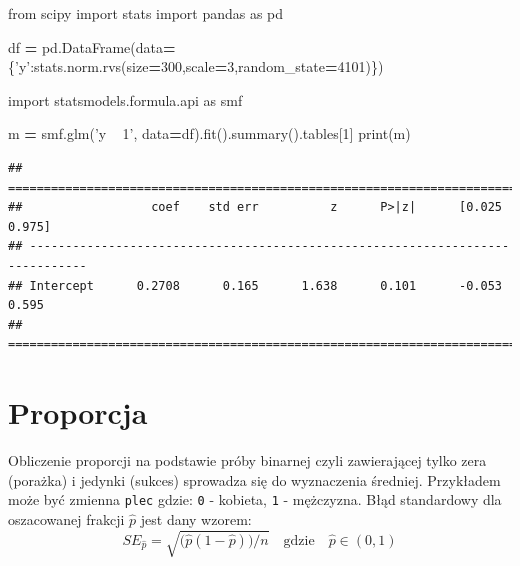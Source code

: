 \documentclass[polish,]{book}
\newenvironment{Shaded}{\begin{snugshade}}{\end{snugshade}}
\newcommand{\BuiltInTok}[1]{#1}
\newcommand{\DecValTok}[1]{\textcolor[rgb]{0.00,0.00,0.81}{#1}}
\newcommand{\ImportTok}[1]{#1}
\newcommand{\NormalTok}[1]{#1}
\newcommand{\OperatorTok}[1]{\textcolor[rgb]{0.81,0.36,0.00}{\textbf{#1}}}
\newcommand{\StringTok}[1]{\textcolor[rgb]{0.31,0.60,0.02}{#1}}
\begin{document}
\begin{Shaded}
\begin{Highlighting}[]
\ImportTok{from}\NormalTok{ scipy }\ImportTok{import}\NormalTok{ stats}
\ImportTok{import}\NormalTok{ pandas }\ImportTok{as}\NormalTok{ pd}

\NormalTok{df }\OperatorTok{=}\NormalTok{ pd.DataFrame(data}\OperatorTok{=}\NormalTok{\{}\StringTok{'y'}\NormalTok{:stats.norm.rvs(size}\OperatorTok{=}\DecValTok{300}\NormalTok{,scale}\OperatorTok{=}\DecValTok{3}\NormalTok{,random_state}\OperatorTok{=}\DecValTok{4101}\NormalTok{)\})}

\ImportTok{import}\NormalTok{ statsmodels.formula.api }\ImportTok{as}\NormalTok{ smf}

\NormalTok{m }\OperatorTok{=}\NormalTok{ smf.glm(}\StringTok{'y ~ 1'}\NormalTok{, data}\OperatorTok{=}\NormalTok{df).fit().summary().tables[}\DecValTok{1}\NormalTok{]}
\BuiltInTok{print}\NormalTok{(m)}
\end{Highlighting}
\end{Shaded}

\begin{verbatim}
## ==============================================================================
##                  coef    std err          z      P>|z|      [0.025      0.975]
## ------------------------------------------------------------------------------
## Intercept      0.2708      0.165      1.638      0.101      -0.053       0.595
## ==============================================================================
\end{verbatim}

\hypertarget{R72}{%
\section{Proporcja}\label{R72}}

Obliczenie proporcji na podstawie próby binarnej czyli zawierającej tylko zera (porażka) i jedynki (sukces) sprowadza się do wyznaczenia średniej. Przykładem może być zmienna \texttt{plec} gdzie: \texttt{0} - kobieta, \texttt{1} - mężczyzna.
Błąd standardowy dla oszacowanej frakcji \(\hat{p}\) jest dany wzorem:
\begin{equation}
SE_{\hat{p}}=\sqrt{\big(\hat{p}(1-\hat{p})\big)/n}\quad\mbox{gdzie}\quad \hat{p}\in(0,1)
\label{eq:se02}
\end{equation}
\end{document}
